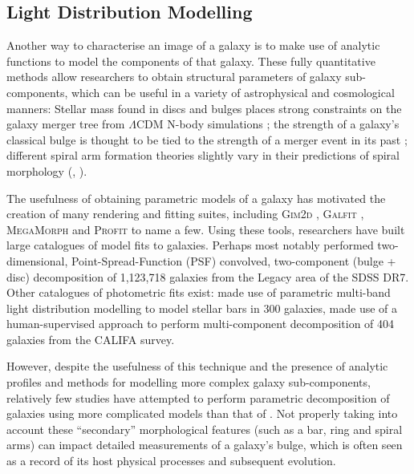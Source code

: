 \documentclass[../main.tex]{subfiles}
\begin{document}
\subsection{Light Distribution Modelling}

Another way to characterise an image of a galaxy is to make use of analytic functions to model the components of that galaxy. These fully quantitative methods allow researchers to obtain structural parameters of galaxy sub-components, which can be useful in a variety of astrophysical and cosmological manners: Stellar mass found in discs and bulges places strong constraints on the galaxy merger tree from $\Lambda\mathrm{CDM}$ N-body simulations \citep{Hopkins2010:1004.2708v3}; the strength of a galaxy's classical bulge is thought to be tied to the strength of a merger event in its past \citep{Kormendy2010:1009.3015v1}; different spiral arm formation theories slightly vary in their predictions of spiral morphology (\citealt{Dobbs2014:1407.5062v1}, \citealt{Pour-Imani2016:1608.00969v1} \citealt{Hart2017:1708.04628v1}).

The usefulness of obtaining parametric models of a galaxy has motivated the creation of many rendering and fitting suites, including \textsc{Gim2d} \citep{gim2d-paper}, \textsc{Galfit} \citep{galfit-paper}, \textsc{MegaMorph} \citep{megamorph-paper} and \textsc{Profit} \citep{profit-paper} to name a few. Using these tools, researchers have built large catalogues of model fits to galaxies. Perhaps most notably \citet{Simard2002:astro-ph/0205025v2} performed two-dimensional, Point-Spread-Function (PSF) convolved, two-component (bulge + disc) decomposition of 1,123,718 galaxies from the Legacy area of the SDSS DR7. Other catalogues of photometric fits exist: \cite{Gadotti2010:1003.1719v2} made use of parametric multi-band light distribution modelling to model stellar bars in 300 galaxies, \cite{Mendez-Abreu2016:1610.05324v1} made use of a human-supervised approach to perform multi-component decomposition of 404 galaxies from the CALIFA survey\citep{Sanchez2011:1111.0962v2}.

However, despite the usefulness of this technique and the presence of analytic profiles and methods for modelling more complex galaxy sub-components, relatively few studies have attempted to perform parametric decomposition of galaxies using more complicated models than that of \citet{Simard2002:astro-ph/0205025v2}. Not properly taking into account these ``secondary'' morphological features (such as a bar, ring and spiral arms) can impact detailed measurements of a galaxy's bulge, which is often seen as a record of its host physical processes and subsequent evolution.
\end{document}
